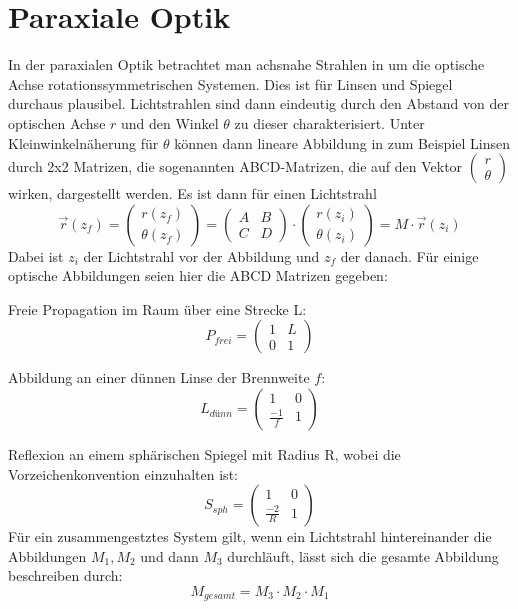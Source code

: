 \documentclass[twoside,colorback,accentcolor=tud4c,11pt]{tudreport}
\begin{document}
\section{Paraxiale Optik}
		In der paraxialen Optik betrachtet man achsnahe Strahlen in um die optische Achse rotationssymmetrischen Systemen. Dies ist für Linsen und Spiegel durchaus plausibel. Lichtstrahlen sind dann eindeutig durch den Abstand von der optischen Achse $r$ und den Winkel $\theta$ zu dieser charakterisiert. Unter Kleinwinkelnäherung für $\theta$ können dann lineare Abbildung in zum Beispiel Linsen durch 2x2 Matrizen, die sogenannten ABCD-Matrizen, die auf den Vektor $\begin{pmatrix}
		r \\ \theta
		\end{pmatrix}$ wirken, dargestellt werden.
		Es ist dann für einen Lichtstrahl
		\[
		\vec{r} \left(z_f\right) = \begin{pmatrix}
		r\left(z_f\right) \\ \theta\left(z_f\right)
		\end{pmatrix} = 
		\begin{pmatrix}
		A & B \\
		C & D   \end{pmatrix} \cdot \begin{pmatrix}
		r\left(z_i\right) \\ \theta\left(z_i\right)
		\end{pmatrix} = M \cdot \vec{r} \left(z_i\right)		
		\]
		Dabei ist $z_i$ der Lichtstrahl vor der Abbildung und $z_f$ der danach.
		Für einige optische Abbildungen seien hier die ABCD Matrizen gegeben:
		
		Freie Propagation im Raum über eine Strecke L:
		\[
		P_{frei} =
		\begin{pmatrix}
		1 & L \\
		0 & 1   \end{pmatrix}
		\]
		
		Abbildung an einer dünnen Linse der Brennweite $f$:
		\[
		L_{dünn} =
		\begin{pmatrix}
		1 & 0 \\
		\frac{-1}{f} & 1   \end{pmatrix}
		\]
		
		Reflexion an einem sphärischen Spiegel mit Radius R, wobei die Vorzeichenkonvention einzuhalten ist:
		\[
		S_{sph} =
		\begin{pmatrix}
		1 & 0 \\
		\frac{-2}{R} & 1   \end{pmatrix}
		\]
		Für ein zusammengestztes System gilt, wenn ein Lichtstrahl hintereinander die Abbildungen $M_1, M_2$ und dann $M_3$ durchläuft, lässt sich die gesamte Abbildung beschreiben durch:
		\[M_{gesamt} = M_3 \cdot M_2 \cdot M_1\]
		
\end{document}
